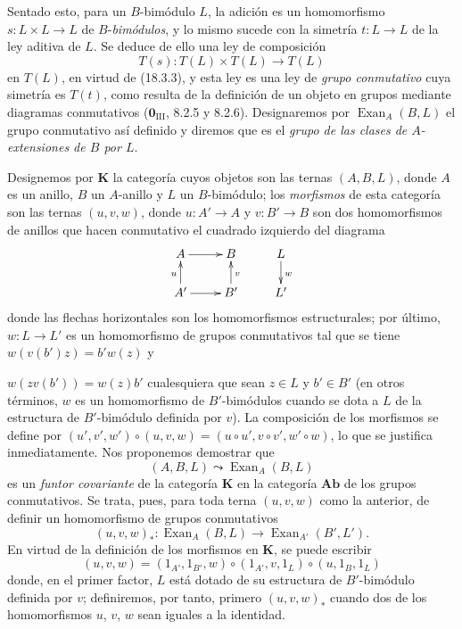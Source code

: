 \begin{env}[18.3.4]
\label{0.18.3.4-fr}
Sentado esto, para un $B$-bimódulo $L$, la adición es un homomorfismo
$s:L\times L\to L$ de $B$-\emph{bimódulos}, y lo mismo sucede con la simetría
$t:L\to L$ de la ley aditiva de $L$. Se deduce de ello una ley de composición
\[
  T(s):T(L)\times T(L)\longrightarrow T(L)
\]
en $T(L)$, en virtud de (18.3.3), y esta ley es una ley de \emph{grupo
conmutativo} cuya simetría es $T(t)$, como resulta de la definición de un
objeto en grupos mediante diagramas conmutativos
($\mathbf 0_{\mathrm{III}}$, 8.2.5 y 8.2.6). Designaremos por
$\operatorname{Exan}_A(B,L)$ el grupo conmutativo así definido y diremos que
es el \emph{grupo de las clases de $A$-extensiones de $B$ por $L$}.
\end{env}

\begin{env}[18.3.5]
\label{0.18.3.5-fr}
Designemos por $\boldsymbol{K}$ la categoría cuyos objetos son las ternas
$(A,B,L)$, donde $A$ es un anillo, $B$ un $A$-anillo y $L$ un $B$-bimódulo;
los \emph{morfismos} de esta categoría son las ternas $(u,v,w)$, donde
$u:A'\to A$ y $v:B'\to B$ son dos homomorfismos de anillos que hacen
conmutativo el cuadrado izquierdo del diagrama
\[
  \xymatrix@C=2pc@R=1.5pc{
    A\ar[r] & B & L\ar[d]^w\\
    A'\ar[u]^u\ar[r] & B'\ar[u]_v & L'
  }
\]
donde las flechas horizontales son los homomorfismos estructurales; por último,
$w:L\to L'$ es un homomorfismo de grupos conmutativos tal que se tiene
$w(v(b')z)=b'w(z)$ y


$w(zv(b'))=w(z)b'$ cualesquiera que sean $z\in L$ y $b'\in B'$ (en otros
términos, $w$ es un homomorfismo de $B'$-bimódulos cuando se dota a $L$ de la
estructura de $B'$-bimódulo definida por $v$). La composición de los morfismos
se define por
$(u',v',w')\circ(u,v,w)=(u\circ u',v\circ v',w'\circ w)$, lo que se justifica
inmediatamente. Nos proponemos demostrar que
\begin{equation}
\label{0.18.3.5.1-fr}
\tag{18.3.5.1}
  (A,B,L)\leadsto\operatorname{Exan}_A(B,L)
\end{equation}
es un \emph{funtor covariante} de la categoría $\boldsymbol{K}$ en la categoría
$\boldsymbol{Ab}$ de los grupos conmutativos. Se trata, pues, para toda terna
$(u,v,w)$ como la anterior, de definir un homomorfismo de grupos conmutativos
\[
  (u,v,w)_*:\operatorname{Exan}_A(B,L)
  \longrightarrow\operatorname{Exan}_{A'}(B',L').
\]
En virtud de la definición de los morfismos en $\boldsymbol{K}$, se puede escribir
\[
  (u,v,w)=(1_{A'},1_{B'},w)\circ(1_{A'},v,1_L)
  \circ(u,1_B,1_L)
\]
donde, en el primer factor, $L$ está dotado de su estructura de $B'$-bimódulo
definida por $v$; definiremos, por tanto, primero $(u,v,w)_*$ cuando dos de los
homomorfismos $u$, $v$, $w$ sean iguales a la identidad.
\end{env}

